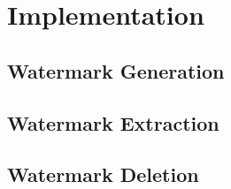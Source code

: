 \chapter{Implementation}

\section{Watermark Generation}


\section{Watermark Extraction}


\section{Watermark Deletion}

